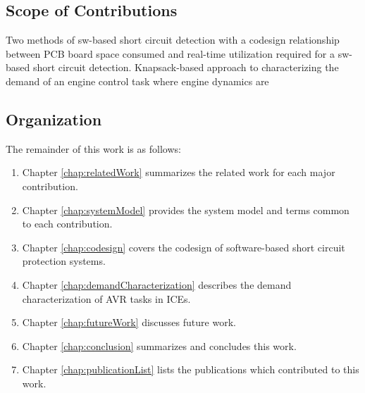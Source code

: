 \subsection{Scope of Contributions}

Two methods of sw-based short circuit detection with a codesign relationship between PCB board space consumed and real-time utilization required for a sw-based short circuit detection.
Knapsack-based approach to characterizing the demand of an engine control task where engine dynamics are 

\subsection{Organization}

The remainder of this work is as follows:

\begin{enumerate}
    \item Chapter \ref{chap:relatedWork} summarizes the related work for each major contribution.
    \item Chapter \ref{chap:systemModel} provides the system model and terms common to each contribution.
    \item Chapter \ref{chap:codesign} covers the codesign of software-based short circuit protection systems.
    \item Chapter \ref{chap:demandCharacterization} describes the demand characterization of AVR tasks in ICEs.
    \item Chapter \ref{chap:futureWork} discusses future work.
    \item Chapter \ref{chap:conclusion} summarizes and concludes this work.
    \item Chapter \ref{chap:publicationList} lists the publications which contributed to this work.
\end{enumerate}